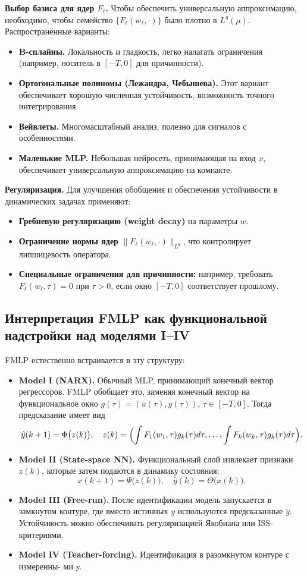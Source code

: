 \documentclass[../NDCNNAI_main.tex]{subfiles}
\begin{document}
\textbf{Выбор базиса для ядер $F_\ell$.} 
Чтобы обеспечить универсальную аппроксимацию, необходимо, чтобы семейство $\{F_\ell(w_\ell, \cdot)\}$ было плотно в $L^q(\mu)$. 
Распространённые варианты:
\begin{itemize}
    \item \textbf{B-сплайны.} Локальность и гладкость, легко налагать ограничения (например, носитель в $[-T,0]$ для причинности).
    \item \textbf{Ортогональные полиномы (Лежандра, Чебышева).} Этот вариант обеспечивает хорошую численная устойчивость, возможность точного интегрирования.
    \item \textbf{Вейвлеты.} Многомасштабный анализ, полезно для сигналов с особенностями.
    \item \textbf{Маленькие MLP.} Небольшая нейросеть, принимающая на вход $x$, обеспечивает универсальную аппроксимацию на компакте.
\end{itemize}

\textbf{Регуляризация.} 
Для улучшения обобщения и обеспечения устойчивости в динамических задачах применяют:
\begin{itemize}
    \item \textbf{Гребневую регуляризацию (weight decay)} на параметры $w$.
    \item \textbf{Ограничение нормы ядер} $\|F_\ell(w_\ell, \cdot)\|_{L^q}$, что контролирует липшицевость оператора.
    \item \textbf{Специальные ограничения для причинности:} например, требовать $F_\ell(w_\ell, \tau)=0$ при $\tau>0$, если окно $[-T,0]$ соответствует прошлому.
\end{itemize}

\subsection{Интерпретация FMLP как функциональной надстройки над моделями I–IV}
FMLP естественно встраивается в эту структуру:
\begin{itemize}
    \item \textbf{Model I (NARX).} Обычный MLP, принимающий конечный вектор регрессоров. 
    FMLP обобщает это, заменяя конечный вектор на функциональное окно $g(\tau) = (u(\tau), y(\tau))$, $\tau \in [-T,0]$. 
    Тогда предсказание имеет вид
    \[
    \hat{y}(k+1) = \Phi\bigl(z(k)\bigr), \quad z(k) = \Bigl(\int F_1(w_1,\tau)g_k(\tau)d\tau, \dots, \int F_k(w_k,\tau)g_k(\tau)d\tau\Bigr).
    \]
    \item \textbf{Model II (State-space NN).} Функциональный слой извлекает признаки $z(k)$, которые затем подаются в динамику состояния:
    \[
    x(k+1) = \Psi\bigl(z(k)\bigr), \quad \hat{y}(k) = \Theta\bigl(x(k)\bigr).
    \]
    \item \textbf{Model III (Free-run).} После идентификации модель запускается в замкнутом контуре, где вместо истинных $y$ используются предсказанные $\hat{y}$. 
    Устойчивость можно обеспечивать регуляризацией Якобиана или ISS-критериями.
    \item \textbf{Model IV (Teacher-forcing).} Идентификация в разомкнутом контуре с измеренны-
ми y.
\end{itemize}
\end{document}
